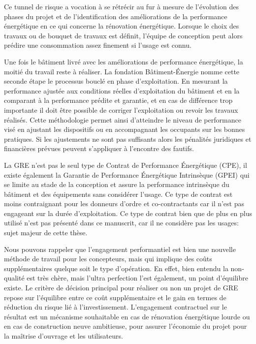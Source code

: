 Ce tunnel de risque a vocation à se rétrécir au fur à mesure de l'évolution des phases du projet et de l'identification des améliorations de la performance énergétique en ce qui concerne la rénovation énergétique. Lorsque le choix des travaux ou de bouquet de travaux est définit, l'équipe de conception peut alors prédire une consommation assez finement si l'usage est connu.

Une fois le bâtiment livré avec les améliorations de performance énergétique, la moitié du travail reste à réaliser. La fondation Bâtiment-Énergie \cite{FBE-16} nomme cette seconde étape le processus bouclé en phase d'exploitation. En mesurant la performance ajustée aux conditions réelles d'exploitation du bâtiment et en la comparant à la performance prédite et garantie, et en cas de différence trop importante il doit être possible de corriger l'exploitation ou revoir les travaux réalisés. Cette méthodologie permet ainsi d'atteindre le niveau de performance visé en ajustant les dispositifs ou en accompagnant les occupants sur les bonnes pratiques. Si les ajustements ne sont pas suffisants alors les pénalités juridiques et financières prévues peuvent s'appliquer à l'encontre des fautifs.

La GRE n'est pas le seul type de Contrat de Performance Énergétique (CPE), il existe également la Garantie de Performance Énergétique Intrinsèque (GPEI) qui se limite au stade de la conception et assure la performance intrinsèque du bâtiment et des équipements sans considérer l'usage. Ce type de contrat est moins contraignant pour les donneurs d'ordre et co-contractants car il n'est pas engageant sur la durée d'exploitation. Ce type de contrat bien que de plus en plus utilisé n'est pas présenté dans ce manuscrit, car il ne considère pas les usages: sujet majeur de cette thèse.

Nous pouvons rappeler que l'engagement performantiel est bien une nouvelle méthode de travail pour les concepteurs, mais qui implique des coûts supplémentaires quelque soit le type d'opération. En effet, bien entendu la non-qualité est très chère, mais l'ultra perfection l'est également, un point d'équilibre existe. Le critère de décision principal pour réaliser ou non un projet de GRE repose sur l'équilibre entre ce coût supplémentaire et le gain en termes de réduction du risque lié à l'investissement. L'engagement contractuel sur le résultat est un mécanisme souhaitable en cas de rénovation énergétique lourde ou en cas de construction neuve ambitieuse, pour assurer l'économie du projet pour la maîtrise d'ouvrage et les utilisateurs. 

